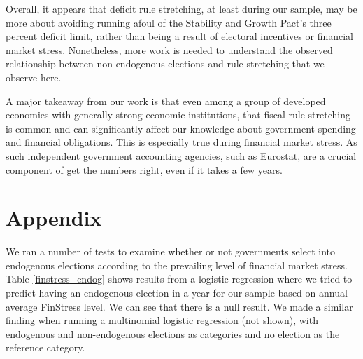 \documentclass[]{article}
\begin{document}
Overall, it appears that deficit rule stretching, at least during our sample, may be more about avoiding running afoul of the Stability and Growth Pact's three percent deficit limit, rather than being a result of electoral incentives or financial market stress. Nonetheless, more work is needed to understand the observed relationship between non-endogenous elections and rule stretching that we observe here.

A major takeaway from our work is that even among a group of developed economies with generally strong economic institutions, that fiscal rule stretching is common and can significantly affect our knowledge about government spending and financial obligations. This is especially true during financial market stress. As such independent government accounting agencies, such as Eurostat, are a crucial component of get the numbers right, even if it takes a few years.


\clearpage




\clearpage

\section*{Appendix}

We ran a number of tests to examine whether or not governments select into endogenous elections according to the prevailing level of financial market stress. Table \ref{finstress_endog} shows results from a logistic regression where we tried to predict having an endogenous election in a year for our sample based on annual average FinStress level. We can see that there is a null result. We made a similar finding when running a multinomial logistic regression (not shown), with endogenous and non-endogenous elections as categories and no election as the reference category.


\end{document}
